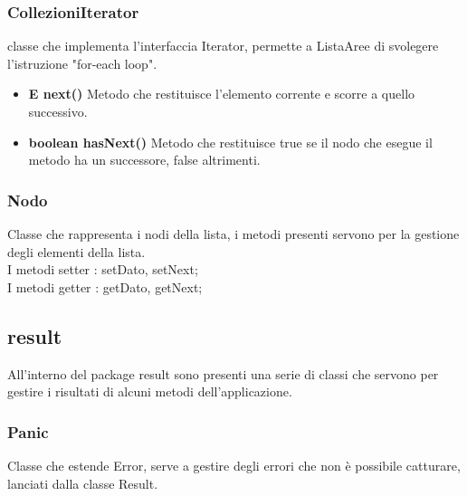 \documentclass[a4paper, 12pt]{report}
\begin{document}
				\subsubsection{CollezioniIterator} classe che implementa l'interfaccia Iterator, permette a ListaAree di svolegere l'istruzione "for-each loop".
				\begin{itemize}
					\item\textbf{E next()} Metodo che restituisce l'elemento corrente e scorre a quello successivo.
					\item\textbf{boolean hasNext()} Metodo che restituisce true se il nodo che esegue il metodo ha un successore, false altrimenti.
				\end{itemize}


				\subsubsection{Nodo}
				Classe che rappresenta i nodi della lista, i metodi presenti servono per la gestione degli elementi della lista.\\
				I metodi setter : setDato, setNext;\\
				I metodi getter : getDato, getNext;
			
			\subsection{result}
				All'interno del package result sono presenti una serie di classi che servono per gestire i risultati di alcuni metodi dell'applicazione.
				\subsubsection{Panic}
				Classe che estende Error, serve a gestire degli errori che non è possibile catturare, lanciati dalla classe Result.
				
				
\end{document}
